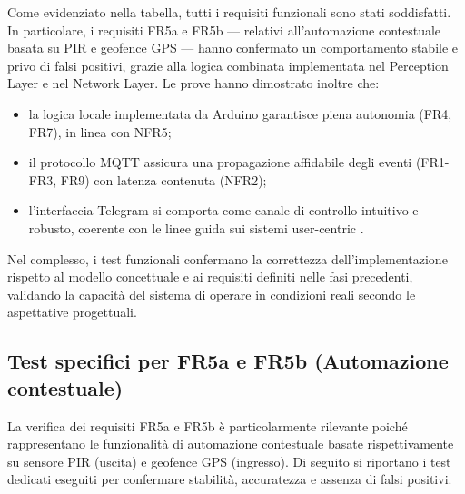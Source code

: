 Come evidenziato nella tabella, tutti i requisiti funzionali sono stati soddisfatti. In particolare, i requisiti FR5a e FR5b — relativi all'automazione contestuale basata su PIR e geofence GPS — hanno confermato un comportamento stabile e privo di falsi positivi, grazie alla logica combinata implementata nel Perception Layer e nel Network Layer.
Le prove hanno dimostrato inoltre che:
\begin{itemize}
    \item la logica locale implementata da Arduino garantisce piena autonomia (FR4, FR7), in linea con NFR5;
    \item il protocollo MQTT assicura una propagazione affidabile degli eventi (FR1-FR3, FR9) con latenza contenuta (NFR2);
    \item l'interfaccia Telegram si comporta come canale di controllo intuitivo e robusto, coerente con le linee guida sui sistemi user-centric \cite{Schiavone2021}.
\end{itemize}

Nel complesso, i test funzionali confermano la correttezza dell'implementazione rispetto al modello concettuale e ai requisiti definiti nelle fasi precedenti, validando la capacità del sistema di operare in condizioni reali secondo le aspettative progettuali.

\subsection{Test specifici per FR5a e FR5b (Automazione contestuale)}
La verifica dei requisiti FR5a e FR5b è particolarmente rilevante poiché rappresentano le funzionalità di automazione contestuale basate rispettivamente su sensore PIR (uscita) e geofence GPS (ingresso). Di seguito si riportano i test dedicati eseguiti per confermare stabilità, accuratezza e assenza di falsi positivi.

